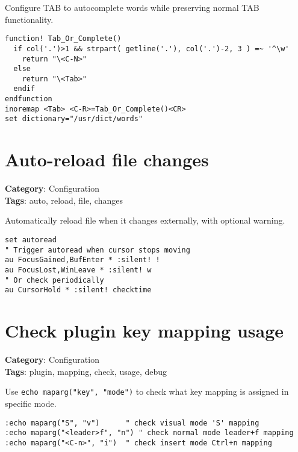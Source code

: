 {{{{Configure TAB to autocomplete words while preserving normal TAB functionality.

\begin{Exa*}{}
\begin{Verbatim}[fontsize=\footnotesize, breaklines, breakanywhere]
function! Tab_Or_Complete()
  if col('.')>1 && strpart( getline('.'), col('.')-2, 3 ) =~ '^\w'
    return "\<C-N>"
  else
    return "\<Tab>"
  endif
endfunction
inoremap <Tab> <C-R>=Tab_Or_Complete()<CR>
set dictionary="/usr/dict/words"
\end{Verbatim}
\end{Exa*}

\section{Auto-reload file changes}

\textbf{Category}: Configuration\\ \textbf{Tags}: auto, reload, file, changes
\vspace{0.5cm}

Automatically reload file when it changes externally, with optional warning.

\begin{Exa*}{}
\begin{Verbatim}[fontsize=\footnotesize, breaklines, breakanywhere]
set autoread
" Trigger autoread when cursor stops moving
au FocusGained,BufEnter * :silent! !
au FocusLost,WinLeave * :silent! w
" Or check periodically
au CursorHold * :silent! checktime
\end{Verbatim}
\end{Exa*}

\section{Check plugin key mapping usage}

\textbf{Category}: Configuration\\ \textbf{Tags}: plugin, mapping, check, usage, debug
\vspace{0.5cm}

Use {\footnotesize \Verb§echo maparg("key", "mode")§} to check what key mapping is assigned in specific mode.

\begin{Exa*}{}
\begin{Verbatim}[fontsize=\footnotesize, breaklines, breakanywhere]
:echo maparg("S", "v")      " check visual mode 'S' mapping
:echo maparg("<leader>f", "n") " check normal mode leader+f mapping  
:echo maparg("<C-n>", "i")  " check insert mode Ctrl+n mapping
\end{Verbatim}
\end{Exa*}

}}}}
